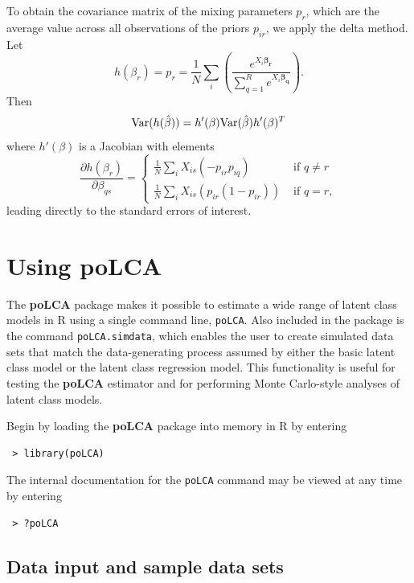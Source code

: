 \documentclass[letterpaper,12pt]{article}
\begin{document}
To obtain the covariance matrix of the mixing parameters $p_r$, which are the average value across all observations of the priors $p_{ir}$, we apply the delta method.  Let
\begin{equation*}
h(\beta_r) = p_r = \frac{1}{N} \sum_i \left( \frac{e^{X_i
\boldsymbol{\beta_r}}}{\sum_{q=1}^R e^{X_i \boldsymbol{\beta_q}}}
\right).
\end{equation*}
Then $$ {\rm Var}(h(\hat \beta)) = h'(\beta) {\rm Var}(\hat \beta) h'(\beta)^T $$ where $h'(\beta)$ is a Jacobian with elements
\begin{equation*}
\frac{\partial h (\beta_r)}{\partial \beta_{qs}}=
\begin{cases}
\frac{1}{N} \sum_i X_{is} (-p_{ir} p_{iq}) & \text{ if } q \neq r \\
\frac{1}{N} \sum_i X_{is} ( p_{ir} (1-p_{ir}) ) & \text{ if } q=r ,
\end{cases}
\end{equation*}
leading directly to the standard errors of interest.


\section{Using \textbf{poLCA}}

The \textbf{poLCA} package makes it possible to estimate a wide range of latent class models in \textsf{R} using a single command line, \texttt{poLCA}. Also included in the package is the command \texttt{poLCA.simdata}, which enables the user to create simulated data sets that match the data-generating process assumed by either the basic latent class model or the latent class regression model. This functionality is useful for testing the \textbf{poLCA} estimator and for performing Monte Carlo-style analyses of latent class models.

Begin by loading the \textbf{poLCA} package into memory in \textsf{R} by entering
\begin{verbatim}
 > library(poLCA)
\end{verbatim}
The internal documentation for the \texttt{poLCA} command may be viewed at any time by entering
\begin{verbatim}
 > ?poLCA
\end{verbatim}

\subsection{Data input and sample data sets}
\end{document}
